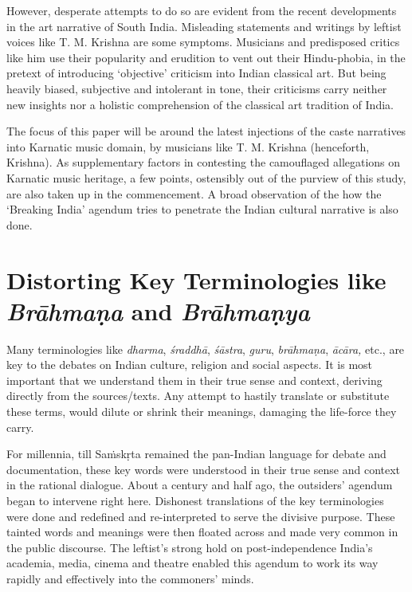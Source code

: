 However, desperate attempts to do so are evident from the recent developments in the art narrative of South India. Misleading statements and writings by leftist voices like T. M. Krishna are some symptoms. Musicians and predisposed critics like him use their popularity and erudition to vent out their Hindu-phobia, in the pretext of introducing ‘objective’ criticism into Indian classical art. But being heavily biased, subjective and intolerant in tone, their criticisms carry neither new insights nor a holistic comprehension of the classical art tradition of India.

The focus of this paper will be around the latest injections of the caste narratives into Karnatic music domain, by musicians like T. M. Krishna (henceforth, Krishna). As supplementary factors in contesting the camouflaged allegations on Karnatic music heritage, a few points, ostensibly out of the purview of this study, are also taken up in the commencement. A broad observation of the how the ‘Breaking India’ agendum tries to penetrate the Indian cultural narrative is also done.

\vspace{-.4cm}

\section*{Distorting Key Terminologies like \textit{Brāhmaṇa} and \textit{Brāhmaṇya}}

Many terminologies like \textit{dharma}, \textit{śraddhā}, \textit{śāstra}, \textit{guru}, \textit{brāhmaṇa}, \textit{ācāra,} etc., are key to the debates on Indian culture, religion and social aspects. It is most important that we understand them in their true sense and context, deriving directly from the sources/texts. Any attempt to hastily translate or substitute these terms, would dilute or shrink their meanings, damaging the life-force they carry.

For millennia, till Saṁskṛta remained the pan-Indian language for debate and documentation, these key words were understood in their true sense and context in the rational dialogue. About a century and half ago, the outsiders’ agendum began to intervene right here. Dishonest translations of the key terminologies were done and redefined and re-interpreted to serve the divisive purpose. These tainted words and meanings were then floated across and made very common in the public discourse. The leftist’s strong hold on post-independence India’s academia, media, cinema and theatre enabled this agendum to work its way rapidly and effectively into the commoners’ minds.

